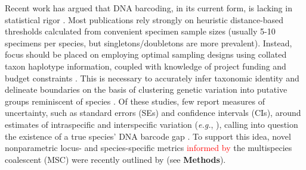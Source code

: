 \documentclass[12pt]{article}
\begin{document}
Recent work has argued that DNA barcoding, in its current form, is lacking in statistical rigor \citep{phillips2022lack}. Most publications rely strongly on heuristic distance-based thresholds calculated from convenient specimen sample sizes (usually 5-10 specimens per species, but singletons/doubletons are more prevalent). Instead, focus should be placed on employing optimal sampling designs using collated taxon haplotype information, coupled with knowledge of project funding and budget constraints \citep{phillips2015exploration, phillips2019incomplete, phillips2020hacsim}. This is necessary to accurately infer taxonomic identity and delineate boundaries on the basis of clustering genetic variation into putative groups reminiscent of species \citep{ phillips2022lack}. Of these studies, few report measures of uncertainty, such as standard errors (SEs) and confidence intervals (CIs), around estimates of intraspecific and interspecific variation (\textit{e.g.}, \citet{wiemers2007does}), calling into question the existence of a true species' DNA barcode gap \citep{candek2015dna, phillips2022lack}. To support this idea, novel nonparametric locus- and species-specific metrics \textcolor{red}{informed by} the multispecies coalescent (MSC) were recently outlined by \citet{phillips2024measure} (see \textbf{Methods}). 
\end{document}
